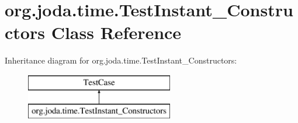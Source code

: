 \hypertarget{classorg_1_1joda_1_1time_1_1_test_instant___constructors}{\section{org.\-joda.\-time.\-Test\-Instant\-\_\-\-Constructors Class Reference}
\label{classorg_1_1joda_1_1time_1_1_test_instant___constructors}
}
Inheritance diagram for org.\-joda.\-time.\-Test\-Instant\-\_\-\-Constructors\-:\begin{figure}[H]
\begin{center}
\leavevmode
\includegraphics[height=2.000000cm]{classorg_1_1joda_1_1time_1_1_test_instant___constructors}
\end{center}
\end{figure}
